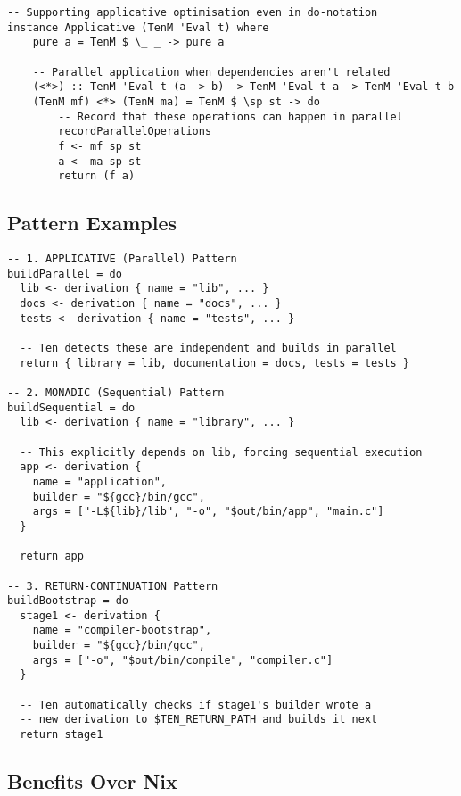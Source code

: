 \documentclass{article}
\begin{document}
\begin{tcolorbox}[title=Core DSL Implementation]
\begin{verbatim}
-- Supporting applicative optimisation even in do-notation
instance Applicative (TenM 'Eval t) where
    pure a = TenM $ \_ _ -> pure a

    -- Parallel application when dependencies aren't related
    (<*>) :: TenM 'Eval t (a -> b) -> TenM 'Eval t a -> TenM 'Eval t b
    (TenM mf) <*> (TenM ma) = TenM $ \sp st -> do
        -- Record that these operations can happen in parallel
        recordParallelOperations
        f <- mf sp st
        a <- ma sp st
        return (f a)
\end{verbatim}
\end{tcolorbox}

\subsection{Pattern Examples}

\begin{tcolorbox}[title=Three Core Patterns with Identical Syntax]
\begin{verbatim}
-- 1. APPLICATIVE (Parallel) Pattern
buildParallel = do
  lib <- derivation { name = "lib", ... }
  docs <- derivation { name = "docs", ... }
  tests <- derivation { name = "tests", ... }

  -- Ten detects these are independent and builds in parallel
  return { library = lib, documentation = docs, tests = tests }

-- 2. MONADIC (Sequential) Pattern
buildSequential = do
  lib <- derivation { name = "library", ... }

  -- This explicitly depends on lib, forcing sequential execution
  app <- derivation {
    name = "application",
    builder = "${gcc}/bin/gcc",
    args = ["-L${lib}/lib", "-o", "$out/bin/app", "main.c"]
  }

  return app

-- 3. RETURN-CONTINUATION Pattern
buildBootstrap = do
  stage1 <- derivation {
    name = "compiler-bootstrap",
    builder = "${gcc}/bin/gcc",
    args = ["-o", "$out/bin/compile", "compiler.c"]
  }

  -- Ten automatically checks if stage1's builder wrote a
  -- new derivation to $TEN_RETURN_PATH and builds it next
  return stage1
\end{verbatim}
\end{tcolorbox}

\subsection{Benefits Over Nix}
\end{document}
